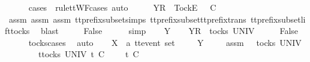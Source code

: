\ \ \ \ \isamarkupfalse%
\ {\isacharparenleft}cases\ {\isasymrho}{\isacharprime}{\isacharprime}\ rule{\isacharcolon}ttWF{\isachardot}cases{\isacharcomma}\ auto{\isacharparenright}\isanewline
\ \ \isamarkupfalse%
\ \isamarkupfalse%
\ {\isachardoublequoteopen}{\isacharbrackleft}Y{\isacharbrackright}\isactrlsub R\ {\isacharhash}\ {\isacharbrackleft}Tock{\isacharbrackright}\isactrlsub E\ {\isacharhash}\ {\isasymrho}{\isacharprime}{\isacharprime}{\isacharprime}\ {\isasymle}\isactrlsub C\ {\isacharbrackleft}{\isacharbrackright}{\isachardoublequoteclose}\isanewline
\ \ \ \ \isamarkupfalse%
\ assm{}{\isacharprime}\ assm{}\ assm{}\ tt{\isacharunderscore}prefix{\isacharunderscore}subset{\isachardot}simps{\isacharparenleft}{}{\isacharparenright}\ tt{\isacharunderscore}prefix{\isacharunderscore}subset{\isacharunderscore}tt{\isacharunderscore}prefix{\isacharunderscore}trans\ tt{\isacharunderscore}prefix{\isacharunderscore}subset{\isacharunderscore}lift{\isacharunderscore}tocks\ \isamarkupfalse%
\ blast\isanewline
\ \ \isamarkupfalse%
\ \isamarkupfalse%
\ {\isachardoublequoteopen}False{\isachardoublequoteclose}\isanewline
\ \ \ \ \isamarkupfalse%
\ simp\isanewline
{}\isamarkupfalse%
\isanewline
\ \ \isamarkupfalse%
\ Y\isanewline
\ \ \isamarkupfalse%
\ {\isachardoublequoteopen}{\isacharbrackleft}{\isacharbrackleft}Y{\isacharbrackright}\isactrlsub R{\isacharbrackright}\ {\isasymin}\ tocks\ UNIV{\isachardoublequoteclose}\isanewline
\ \ \isamarkupfalse%
\ \isamarkupfalse%
\ {\isachardoublequoteopen}False{\isachardoublequoteclose}\isanewline
\ \ \ \ \isamarkupfalse%
\ tocks{\isachardot}cases\ \isamarkupfalse%
\ auto\isanewline
{}\isamarkupfalse%
\isanewline
\ \ \isamarkupfalse%
\ X\ {\isacharcolon}{\isacharcolon}\ {\isachardoublequoteopen}{\isacharprime}a\ ttevent\ set{\isachardoublequoteclose}\isanewline
\ \ \isamarkupfalse%
\ {\isasymrho}\ Y\ {\isasymsigma}{\isacharprime}{\isacharprime}\isanewline
\ \ \isamarkupfalse%
\ assm{}{\isacharcolon}\ {\isachardoublequoteopen}{\isacharparenleft}{\isasymsigma}{\isacharprime}{\isacharprime}\ {\isasymin}\ tocks\ UNIV\ {\isasymLongrightarrow}\isanewline
\ \ \ \ \ \ \ \ {\isasymforall}t{\isasymin}tocks\ UNIV{\isachardot}\ t\ {\isasymle}\isactrlsub C\ {\isasymsigma}{\isacharprime}{\isacharprime}\ {\isacharat}\ {\isasymsigma}\ {\isasymlongrightarrow}\ t\ {\isasymle}\isactrlsub C\ {\isasymsigma}{\isacharprime}{\isacharprime}\ {\isasymLongrightarrow}\isanewline
